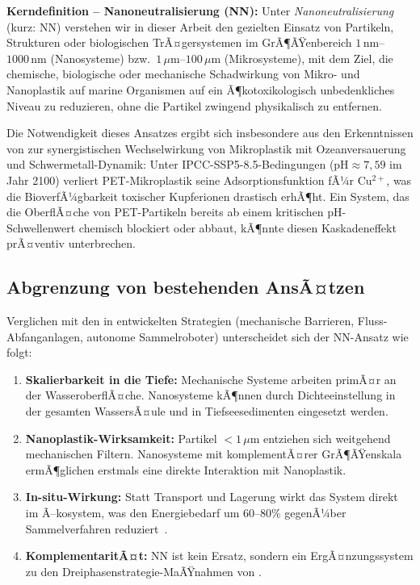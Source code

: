﻿\documentclass[12pt,a4paper]{article}
\theoremstyle{definition}
\theoremstyle{remark}
\begin{document}
\begin{mdframed}[backgroundcolor=lightgray, linecolor=deepblue, linewidth=0.8pt]
\textbf{Kerndefinition -- Nanoneutralisierung (NN):}
Unter \emph{Nanoneutralisierung} (kurz: NN) verstehen wir in dieser Arbeit
den gezielten Einsatz von Partikeln, Strukturen oder biologischen TrÃ¤gersystemen
im GrÃ¶ÃŸenbereich $1\,\text{nm}$--$1000\,\text{nm}$ (Nanosysteme) bzw.\
$1\,\mu\text{m}$--$100\,\mu\text{m}$ (Mikrosysteme), mit dem Ziel, die
chemische, biologische oder mechanische Schadwirkung von Mikro- und Nanoplastik
auf marine Organismen auf ein Ã¶kotoxikologisch unbedenkliches Niveau zu reduzieren,
ohne die Partikel zwingend physikalisch zu entfernen.
\end{mdframed}

Die Notwendigkeit dieses Ansatzes ergibt sich insbesondere aus den Erkenntnissen
von \cite{ocnscnce_epp2026} zur synergistischen Wechselwirkung von Mikroplastik
mit Ozeanversauerung und Schwermetall-Dynamik: Unter IPCC-SSP5-8.5-Bedingungen
($\text{pH} \approx 7{,}59$ im Jahr 2100) verliert PET-Mikroplastik seine
Adsorptionsfunktion fÃ¼r Cu$^{2+}$, was die BioverfÃ¼gbarkeit toxischer
Kupferionen drastisch erhÃ¶ht. Ein System, das die OberflÃ¤che von
PET-Partikeln bereits ab einem kritischen pH-Schwellenwert chemisch blockiert
oder abbaut, kÃ¶nnte diesen Kaskadeneffekt prÃ¤ventiv unterbrechen.

\subsection{Abgrenzung von bestehenden AnsÃ¤tzen}

Verglichen mit den in \cite{cleanocn_epp2026} entwickelten Strategien
(mechanische Barrieren, Fluss-Abfanganlagen, autonome Sammelroboter) unterscheidet
sich der NN-Ansatz wie folgt:

\begin{enumerate}[label=\textbf{U\arabic*.}]
\item \textbf{Skalierbarkeit in die Tiefe:} Mechanische Systeme arbeiten primÃ¤r
an der WasseroberflÃ¤che. Nanosysteme kÃ¶nnen durch Dichteeinstellung in der gesamten
WassersÃ¤ule und in Tiefseesedimenten eingesetzt werden.
\item \textbf{Nanoplastik-Wirksamkeit:} Partikel $< 1\,\mu\text{m}$ entziehen
sich weitgehend mechanischen Filtern. Nanosysteme mit komplementÃ¤rer GrÃ¶ÃŸenskala
ermÃ¶glichen erstmals eine direkte Interaktion mit Nanoplastik.
\item \textbf{In-situ-Wirkung:} Statt Transport und Lagerung wirkt das System
direkt im Ã–kosystem, was den Energiebedarf um $60$--$80\%$ gegenÃ¼ber
Sammelverfahren reduziert~\cite{koelmans2022risk}.
\item \textbf{KomplementaritÃ¤t:} NN ist kein Ersatz, sondern ein ErgÃ¤nzungssystem
zu den Dreiphasenstrategie-MaÃŸnahmen von \cite{cleanocn_epp2026}.
\end{enumerate}
\end{document}
